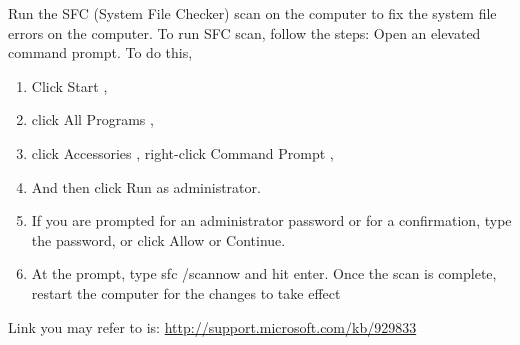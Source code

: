 Run the SFC (System File Checker) scan on the computer to fix the system file errors on the computer.
To run SFC scan, follow the steps:
Open an elevated command prompt. To do this,\begin{enumerate} \item Click Start ,
\item click All Programs ,
\item click Accessories , right-click Command Prompt ,
\item And then click Run as administrator.
\item If you are prompted for an administrator password or for a confirmation, type the password, or click Allow or Continue.
\item At the prompt, type sfc /scannow and hit enter. Once the scan is complete, restart the computer for the changes to take effect
\end{enumerate}                                                                                                                 
Link you may refer to is: \url{http://support.microsoft.com/kb/929833}
